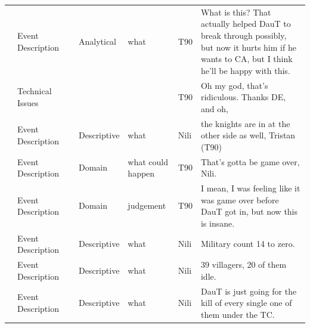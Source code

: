 {\begin{longtable}{@{}>{\theAppRow}r|L{2.3cm}L{2.2cm}L{1.4cm}L{2.2cm}L{0.5cm}U{5.6cm}@{}}
    & Event Description     &                      & Analytical  & what              & T90     & What is this? That actually helped DauT to break through possibly, but now it hurts him if he wants to CA, but I think he'll be happy with this.                                                                         \\
    & Technical Issues      &                      &             &                   & T90     & Oh my god, that's ridiculous. Thanks DE, and oh,                                                                                                                                                                         \\
    & Event Description     &                      & Descriptive   & what              & Nili    & the knights are in at the other side as well, Tristan (T90)                                                                                                                                                              \\
    & Event Description     &                      & Domain      & what could happen & T90     & That's gotta be game over, Nili.                                                                                                                                                                                         \\
    & Event Description     &                      & Domain      & judgement         & T90     & I mean, I was feeling like it was game over before DauT got in, but now this is insane.                                                                                                                                  \\
    & Event Description     &                      & Descriptive   & what              & Nili    & Military count 14 to zero.                                                                                                                                                                                               \\
    & Event Description     &                      & Descriptive   & what              & Nili    & 39 villagers, 20 of them idle.                                                                                                                                                                                           \\
    & Event Description     &                      & Descriptive   & what              & Nili    & DauT is just going for the kill of every single one of them under the TC.                                                                                                                                                \\

\end{longtable}}
